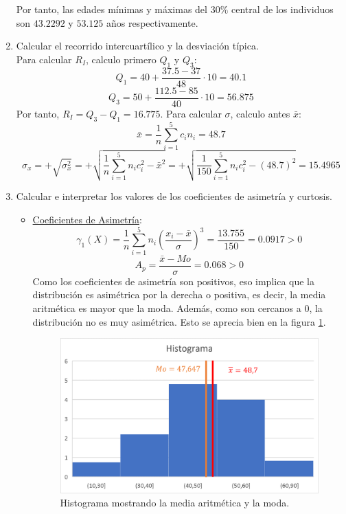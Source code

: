\begin{ejercicio}
\begin{enumerate}
        Por tanto, las edades mínimas y máximas del $30\%$ central de los individuos son $43.2292$ y $53.125$ años respectivamente.
        
        \item Calcular el recorrido intercuartílico y la desviación típica.\\
        Para calcular $R_I$, calculo primero $Q_1$ y $Q_3$:
        $$Q_{1} = 40 + \frac{37.5-37}{48}\cdot 10 = 40.1$$
        $$Q_{3} = 50 + \frac{112.5-85}{40}\cdot 10 = 56.875$$
        Por tanto, $R_I = Q_3 - Q_1 = 16.775$. Para calcular $\sigma$, calculo antes $\bar{x}$:
        $$\bar{x} = \frac{1}{n}\sum_{i=1}^5 c_in_i = 48.7$$
        $$\sigma_{x} = +\sqrt{\sigma_{x}^2} = +\sqrt{\frac{1}{n}\sum_{i=1}^5n_ic_i^2 - \bar{x}^2}
            =  +\sqrt{\frac{1}{150}\sum_{i=1}^5n_ic_i^2 - (48.7)^2} = 15.4965$$

        \item Calcular e interpretar los valores de los coeficientes de asimetría y curtosis.
        \begin{itemize}
            \item \underline{Coeficientes de Asimetría}:\\
            $$\gamma_1(X) = \frac{1}{n}\sum_{i=1}^5 n_i\left(\frac{x_i - \bar{x}}{\sigma} \right)^3 = \frac{13.755}{150} = 0.0917 > 0$$
            $$A_p = \frac{\bar{x}-Mo}{\sigma} = 0.068 > 0$$
            Como los coeficientes de asimetría son positivos, eso implica que la distribución es asimétrica por la derecha o positiva, es decir, la media aritmética es mayor que la moda. Además, como son cercanos a 0, la distribución no es muy asimétrica. Esto se aprecia bien en la figura \ref{fig:Ej10.Simetria}.
            \begin{figure}[H]
                \centering
                \includegraphics[width=0.8\linewidth]{Imagenes/Ej10.Simetria.png}
                \caption{Histograma mostrando la media aritmética y la moda.}
                \label{fig:Ej10.Simetria}
            \end{figure}


\end{itemize}
\end{enumerate}
\end{ejercicio}
